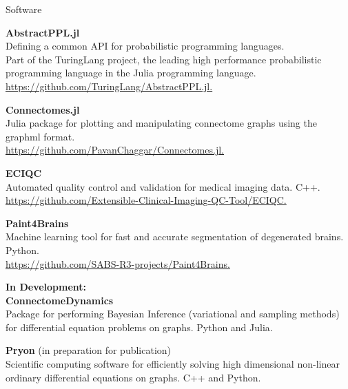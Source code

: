 \begin{rSection}{Software}

{\bf AbstractPPL.jl} \\
Defining a common API for probabilistic programming languages. \\
Part of the TuringLang project, the leading high performance probabilistic programming language
in the Julia programming language.
\href{https://github.com/TuringLang/AbstractPPL.jl}{https://github.com/TuringLang/AbstractPPL.jl.}

{\bf Connectomes.jl} \\
Julia package for plotting and manipulating connectome graphs using the graphml format. \\
\href{https://github.com/PavanChaggar/Connectomes.jl}{https://github.com/PavanChaggar/Connectomes.jl.}

{\bf ECIQC} \\
Automated quality control and validation for medical imaging data. C++.  \\
\href{https://github.com/Extensible-Clinical-Imaging-QC-Tool/ECIQC}{https://github.com/Extensible-Clinical-Imaging-QC-Tool/ECIQC.}

{\bf Paint4Brains} \\
Machine learning tool for fast and accurate segmentation of degenerated brains. Python. \\
\href{https://github.com/SABS-R3-projects/Paint4Brains}{https://github.com/SABS-R3-projects/Paint4Brains.}

{\bf In Development: } \\
{\bf ConnectomeDynamics}  \\
Package for performing Bayesian Inference (variational and sampling methods) for differential equation problems on graphs. Python and Julia. 

{\bf Pryon} (in preparation for publication) \\
Scientific computing software for efficiently solving high dimensional non-linear ordinary differential equations on graphs. C++ and Python.

\end{rSection}